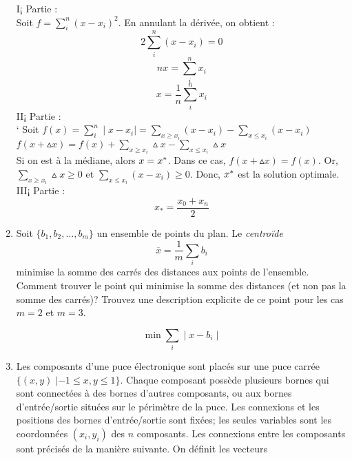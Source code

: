 \begin{enumerate}
    \begin{solution}
      I¡ Partie : \\
      \newline
      Soit $f = \sum_{i}^{n}(x-x_{i})^{2}$. En annulant la dérivée, on obtient : 
      $$ 2\sum_{i}^{n}(x-x_{i}) = 0$$
      $$ nx = \sum_{i}^{n} x_{i}$$
      $$ x = \frac{1}{n}\sum_{i}^{n} x_{i}$$
      \newline
      II¡ Partie : \\
      \newline`
      Soit $f(x) = \sum_{i}^{n}\mid x-x_{i}\mid = \sum_{x \geq x_{i}} (x-x_{i}) - \sum_{x \le x_{i}} (x-x_{i})$\\
      \newline
      $f(x + \vartriangle x) = f(x) + \sum_{x \geq x_{i}} \vartriangle x - \sum_{x \le x_{i}} \vartriangle x$ \\
      \newline
      Si on est à la médiane, alors $x = x^*$. Dans ce cas, $f(x + \vartriangle x) = f(x) $. Or, $\sum_{x \geq x_{i}} \vartriangle x \geq 0$ et $  \sum_{x \le x_{i}} (x-x_{i}) \geq 0$. Donc, $x^*$ est la solution optimale. \\
      \newline
      III¡ Partie : \\
      \newline
      $$x_{*} = \frac{x_{0} + x_{n}}{2}$$
    \end{solution}



  \item  Soit $\{b_1, b_2, \ldots, b_m\}$ un ensemble de points du plan. Le \emph{centro\"ide}
    $$\overline x = \frac{1}{m} \sum_i b_i$$
    minimise la somme des carrés des distances aux points de l'ensemble. Comment trouver le point qui minimise la somme des distances (et
    non pas la somme des carrés)? Trouvez une description explicite de ce point pour les cas $m=2$ et $m=3$.

    \begin{solution}
      $$\min \sum_{i} \mid x - b_{i} \mid $$
    \end{solution}




  \item  Les composants d'une puce électronique sont placés sur
    une puce carrée $\{ (x, y) \; |  -1 \leq x, y \leq 1\}$.
    Chaque composant possède plusieurs bornes qui sont connectées à
    des bornes d'autres composants, ou aux bornes d'entrée/\-sortie situées sur le périmètre de la puce.  Les connexions et les
    positions des bornes d'entrée/sortie sont fixées; les seules variables sont les coordonnées   $(x_i, y_i)$ des $n$
    composants.  Les connexions entre les composants
    sont précisés de la manière suivante. On définit les vecteurs



\end{enumerate}

